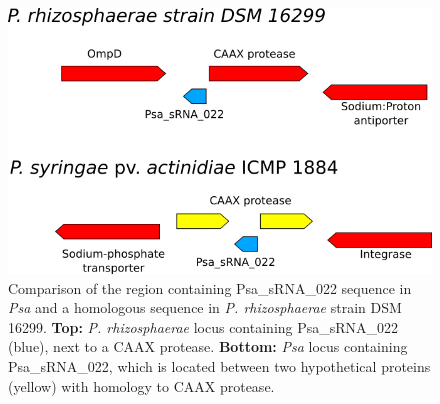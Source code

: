  \hfill
\begin{figure}[H]
    \centering
    \includegraphics[scale=1.5]{psa/psa_ncRNA/sRNA_022.png}
        \caption[Comparison of the Psa\_sRNA\_022 locus in \textit{Psa} and \textit{P. rhizophaerae}]{Comparison of the region containing Psa_sRNA_022 sequence in \textit{Psa} and a homologous sequence in \textit{P. rhizosphaerae} strain DSM 16299. \textbf{Top:} \textit{P. rhizosphaerae} locus containing Psa\_sRNA\_022 (blue), next to a CAAX protease. \textbf{Bottom:} \textit{Psa} locus containing Psa\_sRNA\_022, which is located between two hypothetical proteins (yellow) with homology to CAAX protease. }
    \label{fig:srna_022_operon}
\end{figure}
